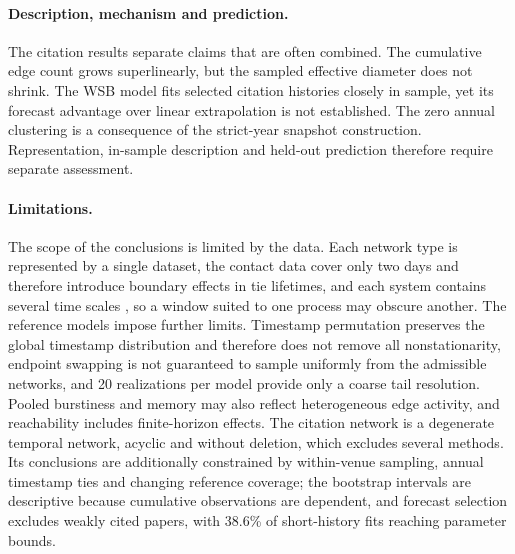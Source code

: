 \paragraph{Description, mechanism and prediction.}
The citation results separate claims that are often combined. The cumulative edge count
grows superlinearly, but the sampled effective diameter does not shrink. The WSB model fits
selected citation histories closely in sample, yet its forecast advantage over linear
extrapolation is not established. The zero annual clustering is a consequence of the
strict-year snapshot construction. Representation, in-sample description and held-out
prediction therefore require separate assessment.

\paragraph{Limitations.}
The scope of the conclusions is limited by the data. Each network type is represented by a
single dataset, the contact data cover only two days and therefore introduce boundary
effects in tie lifetimes, and each system contains several time scales
\citep{holme2015modern}, so a window suited to one process may obscure another. The
reference models impose further limits. Timestamp permutation preserves the global
timestamp distribution and therefore does not remove all nonstationarity, endpoint swapping
is not guaranteed to sample uniformly from the admissible networks, and 20 realizations per
model provide only a coarse tail resolution. Pooled burstiness and memory may also reflect
heterogeneous edge activity, and reachability includes finite-horizon effects. The citation
network is a degenerate temporal network, acyclic and without deletion, which excludes
several methods. Its conclusions are additionally constrained by within-venue sampling,
annual timestamp ties and changing reference coverage; the bootstrap intervals are
descriptive because cumulative observations are dependent, and forecast selection excludes
weakly cited papers, with 38.6\% of short-history fits reaching parameter bounds.
